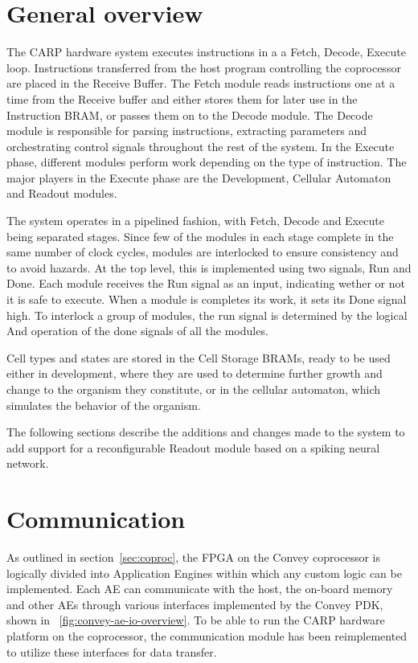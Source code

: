 \section{General overview}

The CARP hardware system executes instructions in a a Fetch, Decode, Execute
loop. Instructions transferred from the host program controlling the coprocessor
are placed in the Receive Buffer. The Fetch module reads instructions one at a
time from the Receive buffer and either stores them for later use in the
Instruction BRAM, or passes them on to the Decode module. The Decode module is
responsible for parsing instructions, extracting parameters and orchestrating
control signals throughout the rest of the system. In the Execute phase,
different modules perform work depending on the type of instruction. The major
players in the Execute phase are the Development, Cellular Automaton and Readout
modules.

The system operates in a pipelined fashion, with Fetch, Decode and Execute being
separated stages. Since few of the modules in each stage complete in the same
number of clock cycles, modules are interlocked to ensure consistency and to
avoid hazards. At the top level, this is implemented using two signals, Run and
Done. Each module receives the Run signal as an input, indicating wether or not
it is safe to execute. When a module is completes its work, it sets its Done
signal high. To interlock a group of modules, the run signal is determined by
the logical And operation of the done signals of all the modules.

Cell types and states are stored in the Cell Storage BRAMs, ready to be used
either in development, where they are used to determine further growth and
change to the organism they constitute, or in the cellular automaton, which
simulates the behavior of the organism.

The following sections describe the additions and changes made to the system to
add support for a reconfigurable Readout module based on a spiking neural
network.

\section{Communication}
\label{sec:communication}

As outlined in section~\ref{sec:coproc}, the FPGA on the Convey coprocessor is
logically divided into Application Engines within which any custom logic can be
implemented. Each AE can communicate with the host, the on-board memory and
other AEs through various interfaces implemented by the Convey PDK, shown in
\figurename~\ref{fig:convey-ae-io-overview}. To be able to run the CARP hardware
platform on the coprocessor, the communication module has been reimplemented to
utilize these interfaces for data transfer.

